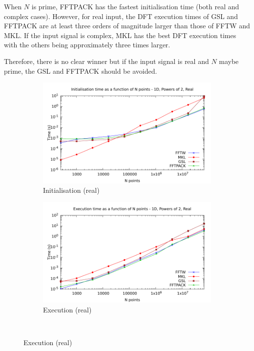 \documentclass[12pt, a4paper]{article} \setlength{\textheight}{24cm}
\begin{document}
When $N$ is prime, FFTPACK has the fastest initialisation time (both
real and complex cases). However, for real input, the DFT execution
times of GSL and FFTPACK are at least three orders of magnitude larger
than those of FFTW and MKL. If the input signal is complex, MKL has
the best DFT execution times with the others being approximately three
times larger.


Therefore, there is no clear winner but if the input signal is real
and $N$ maybe prime, the GSL and FFTPACK should be avoided.


\begin{figure}[H]
  \centering
  \begin{subfigure}{.5\textwidth}
    \centering
    \includegraphics[width=.9\linewidth]{graphs/1d-pow2-init-r.pdf}
    \caption{Initialisation (real)}
    \label{1DPOW2RI}
  \end{subfigure}%
  \begin{subfigure}{.5\textwidth}
    \centering
    \includegraphics[width=.9\linewidth]{graphs/1d-pow2-exec-r.pdf}
    \caption{Execution (real)}
    \label{1DPOW2R}
  \end{subfigure}\\

\end{figure}
\end{document}

